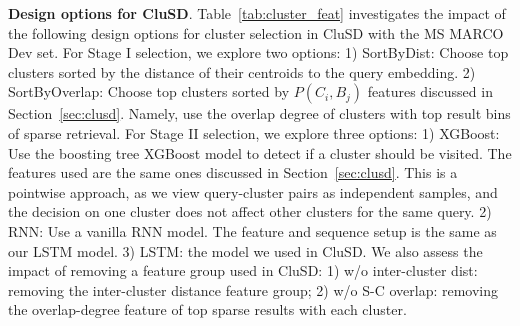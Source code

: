 {\bf Design options for CluSD}.
\label{sect:evalLSTM}
Table~\ref{tab:cluster_feat} investigates the impact of the following design options 
for cluster selection in CluSD with  the MS MARCO Dev set. 
For Stage I selection, we explore two options:
1) SortByDist: Choose top clusters sorted by the distance of their  centroids to  the  query embedding.
2)  SortByOverlap:  Choose top  clusters sorted  by $P(C_i, B_j)$ features discussed in Section~\ref{sec:clusd}.
Namely, use the overlap degree of clusters with top result bins of sparse retrieval. 
For Stage II selection, we explore three options:
    1) XGBoost: Use the boosting tree XGBoost model to detect if a cluster should be visited.
The features used are the same ones discussed in Section~\ref{sec:clusd}. This is a pointwise approach, as we view query-cluster pairs as independent samples, and the decision on one cluster does not affect other clusters for the same query.
    2) RNN: Use a vanilla RNN model. The feature and sequence setup is the same as our LSTM model. 
    3) LSTM: the model we used in CluSD.
 We also assess  the impact  of removing a  feature group used in CluSD:
1) w/o inter-cluster dist: removing  the inter-cluster distance feature group;
2) w/o S-C overlap: removing  the overlap-degree feature of top sparse results with each cluster.





